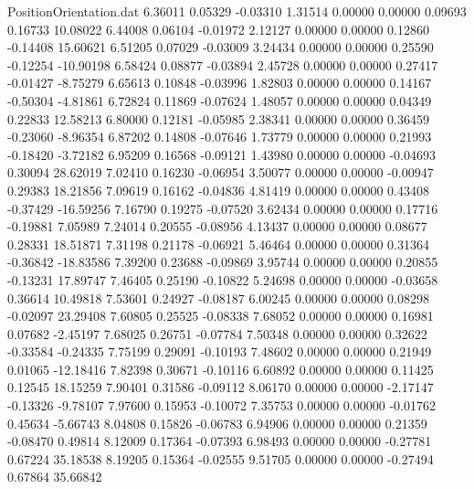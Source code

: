\begin{filecontents}{PositionOrientation.dat}
   6.36011    0.05329   -0.03310     1.31514    0.00000    0.00000    0.09693    0.16733   10.08022
   6.44008    0.06104   -0.01972     2.12127    0.00000    0.00000    0.12860   -0.14408   15.60621
   6.51205    0.07029   -0.03009     3.24434    0.00000    0.00000    0.25590   -0.12254  -10.90198
   6.58424    0.08877   -0.03894     2.45728    0.00000    0.00000    0.27417   -0.01427   -8.75279
   6.65613    0.10848   -0.03996     1.82803    0.00000    0.00000    0.14167   -0.50304   -4.81861
   6.72824    0.11869   -0.07624     1.48057    0.00000    0.00000    0.04349    0.22833   12.58213
   6.80000    0.12181   -0.05985     2.38341    0.00000    0.00000    0.36459   -0.23060   -8.96354
   6.87202    0.14808   -0.07646     1.73779    0.00000    0.00000    0.21993   -0.18420   -3.72182
   6.95209    0.16568   -0.09121     1.43980    0.00000    0.00000   -0.04693    0.30094   28.62019
   7.02410    0.16230   -0.06954     3.50077    0.00000    0.00000   -0.00947    0.29383   18.21856
   7.09619    0.16162   -0.04836     4.81419    0.00000    0.00000    0.43408   -0.37429  -16.59256
   7.16790    0.19275   -0.07520     3.62434    0.00000    0.00000    0.17716   -0.19881    7.05989
   7.24014    0.20555   -0.08956     4.13437    0.00000    0.00000    0.08677    0.28331   18.51871
   7.31198    0.21178   -0.06921     5.46464    0.00000    0.00000    0.31364   -0.36842  -18.83586
   7.39200    0.23688   -0.09869     3.95744    0.00000    0.00000    0.20855   -0.13231   17.89747
   7.46405    0.25190   -0.10822     5.24698    0.00000    0.00000   -0.03658    0.36614   10.49818
   7.53601    0.24927   -0.08187     6.00245    0.00000    0.00000    0.08298   -0.02097   23.29408
   7.60805    0.25525   -0.08338     7.68052    0.00000    0.00000    0.16981    0.07682   -2.45197
   7.68025    0.26751   -0.07784     7.50348    0.00000    0.00000    0.32622   -0.33584   -0.24335
   7.75199    0.29091   -0.10193     7.48602    0.00000    0.00000    0.21949    0.01065  -12.18416
   7.82398    0.30671   -0.10116     6.60892    0.00000    0.00000    0.11425    0.12545   18.15259
   7.90401    0.31586   -0.09112     8.06170    0.00000    0.00000   -2.17147   -0.13326   -9.78107
   7.97600    0.15953   -0.10072     7.35753    0.00000    0.00000   -0.01762    0.45634   -5.66743
   8.04808    0.15826   -0.06783     6.94906    0.00000    0.00000    0.21359   -0.08470    0.49814
   8.12009    0.17364   -0.07393     6.98493    0.00000    0.00000   -0.27781    0.67224   35.18538
   8.19205    0.15364   -0.02555     9.51705    0.00000    0.00000   -0.27494    0.67864   35.66842

\end{filecontents}
